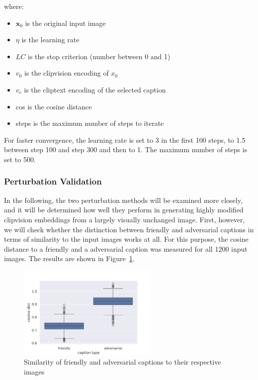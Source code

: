 where:
\begin{itemize}
    \item $\mathbf{x}_0$ is the original input image
    \item $\eta$ is the learning rate
    \item $LC$ is the stop criterion (number between 0 and 1)
    \item $v_0$ is the clipvision encoding of $x_0$
    \item $v_c$ is the cliptext encoding of the selected caption
    \item cos is the cosine distance
    \item steps is the maximum number of steps to iterate
\end{itemize}

For faster convergence, the learning rate is set to 3 in the first 100 steps, to 1.5 between step 100 and step 300 and then to 1. The maximum number of steps is set to 500.

\subsubsection{Perturbation Validation}

In the following, the two perturbation methods will be examined more closely, and it will be determined how well they perform in generating highly modified clipvision embeddings from a largely visually unchanged image. First, however, we will check whether the distinction between friendly and adversarial captions in terms of similarity to the input images works at all. For this purpose, the cosine distance to a friendly and a adversarial caption was measured for all 1200 input images. The results are shown in Figure~\ref{fig:advpert_sanity_check_friendly_vs_adversarial_cap}.

\begin{figure}[ht]
    \centering
    \includegraphics[width=0.6\textwidth]{plots/advpert_sanity_check_friendly_vs_adversarial_cap.png}
    \caption{Similarity of friendly and adversarial captions to their respective images}\label{fig:advpert_sanity_check_friendly_vs_adversarial_cap}
\end{figure}

